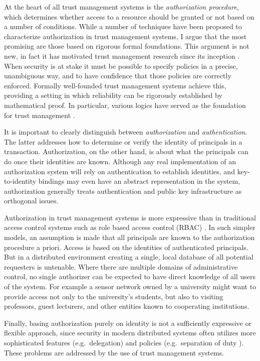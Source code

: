 At the heart of all trust management systems is the \emph{authorization procedure}, which
determines whether access to a resource should be granted or not based on a number of
conditions. While a number of techniques have been proposed to characterize authorization in
trust management systems, I argue that the most promising are those based on rigorous formal
foundations. This argument is not new, in fact it has motivated trust management research since
its inception \cite{woo93authorizations}. When security is at stake it must be possible to
specify policies in a precise, unambiguous way, and to have confidence that those policies are
correctly enforced. Formally well-founded trust management systems achieve this, providing a
setting in which reliability can be rigorously established by mathematical proof. In particular,
various logics have served as the foundation for trust management
\cite{Abadi:LAC,Bertino:LFRAACM}.

It is important to clearly distinguish between \emph{authorization} and \emph{authentication}.
The latter addresses how to determine or verify the identity of principals in a transaction.
Authorization, on the other hand, is about what the principals can do once their identities are
known. Although any real implementation of an authorization system will rely on authentication
to establish identities, and key-to-identity bindings may even have an abstract representation
in the system, authorization generally treats authentication and public key infrastructure as
orthogonal issues.

Authorization in trust management systems is more expressive than in traditional access control
systems such as role based access control (RBAC) \cite{Sandhu:RBACM}. In such simpler models, an
assumption is made that all principals are known to the authorization procedure a priori. Access
is based on the identities of authenticated principals. But in a distributed environment
creating a single, local database of all potential requesters is untenable. Where there are
multiple domains of administrative control, no single authorizer can be expected to have direct
knowledge of all users of the system. For example a sensor network owned by a university might
want to provide access not only to the university's students, but also to visiting professors,
guest lecturers, and other entities known to cooperating institutions.

Finally, basing authorization purely on identity is not a sufficiently expressive or flexible
approach, since security in modern distributed systems often utilizes more sophisticated
features (e.g.~delegation) and policies (e.g.~separation of duty \cite{Simon:SODRBE}). These
problems are addressed by the use of trust management systems.

